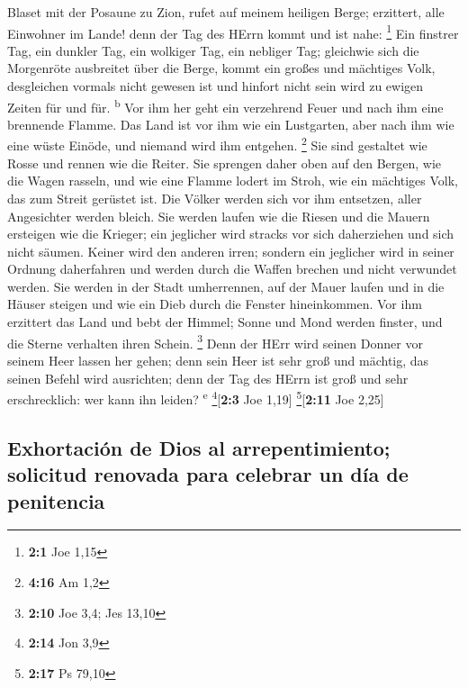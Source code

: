  Blaset mit der Posaune zu Zion, rufet auf meinem heiligen
Berge; erzittert, alle Einwohner im Lande! denn der Tag des HErrn kommt
und ist nahe: \footnote{\textbf{2:1} Joe 1,15}  Ein
finstrer Tag, ein dunkler Tag, ein wolkiger Tag, ein nebliger Tag;
gleichwie sich die Morgenröte ausbreitet über die Berge, kommt ein
großes und mächtiges Volk, desgleichen vormals nicht gewesen ist und
hinfort nicht sein wird zu ewigen Zeiten für und für.
\textsuperscript{b}  Vor ihm her geht ein verzehrend Feuer
und nach ihm eine brennende Flamme. Das Land ist vor ihm wie ein
Lustgarten, aber nach ihm wie eine wüste Einöde, und niemand wird ihm
entgehen. \footnote{\textbf{4:16} Am 1,2}  Sie sind
gestaltet wie Rosse und rennen wie die Reiter.  Sie
sprengen daher oben auf den Bergen, wie die Wagen rasseln, und wie eine
Flamme lodert im Stroh, wie ein mächtiges Volk, das zum Streit gerüstet
ist.  Die Völker werden sich vor ihm entsetzen, aller
Angesichter werden bleich.  Sie werden laufen wie die
Riesen und die Mauern ersteigen wie die Krieger; ein jeglicher wird
stracks vor sich daherziehen und sich nicht säumen. 
Keiner wird den anderen irren; sondern ein jeglicher wird in seiner
Ordnung daherfahren und werden durch die Waffen brechen und nicht
verwundet werden.  Sie werden in der Stadt umherrennen,
auf der Mauer laufen und in die Häuser steigen und wie ein Dieb durch
die Fenster hineinkommen.  Vor ihm erzittert das Land und
bebt der Himmel; Sonne und Mond werden finster, und die Sterne verhalten
ihren Schein. \footnote{\textbf{2:10} Joe 3,4; Jes 13,10}
 Denn der HErr wird seinen Donner vor seinem Heer lassen
her gehen; denn sein Heer ist sehr groß und mächtig, das seinen Befehl
wird ausrichten; denn der Tag des HErrn ist groß und sehr erschrecklich:
wer kann ihn leiden? \textsuperscript{e} \footnote{\textbf{2:14} Jon 3,9}{[}\textbf{2:3}
Joe 1,19{]} \footnote{\textbf{2:17} Ps 79,10}{[}\textbf{2:11} Joe
2,25{]}

\hypertarget{exhortaciuxf3n-de-dios-al-arrepentimiento-solicitud-renovada-para-celebrar-un-duxeda-de-penitencia}{%
\subsection{Exhortación de Dios al arrepentimiento; solicitud renovada
para celebrar un día de
penitencia}\label{exhortaciuxf3n-de-dios-al-arrepentimiento-solicitud-renovada-para-celebrar-un-duxeda-de-penitencia}}


